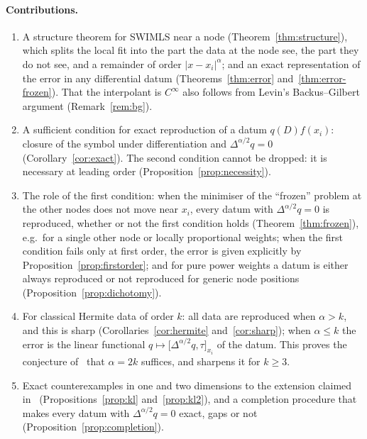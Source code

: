 \documentclass[12pt]{amsart}
\theoremstyle{definition}
\theoremstyle{remark}
\newcommand{\fpz}[3]{\bigl[#1,#2\bigr]_{#3}}     %
\begin{document}
\paragraph{Contributions.}
\begin{enumerate}[label=(\arabic*)]
  \item A structure theorem for SWIMLS near a node (Theorem~\ref{thm:structure}), which splits
        the local fit into the part the data at the node see, the part they do not see, and a
        remainder of order $|x-x_i|^\alpha$; and an exact representation of the error in any
        differential datum (Theorems~\ref{thm:error} and~\ref{thm:error-frozen}). That the
        interpolant is $C^\infty$ also follows from Levin's Backus--Gilbert argument
        (Remark~\ref{rem:bg}).
  \item A sufficient condition for exact reproduction of a datum $q(D)f(x_i)$: closure of the
        symbol under differentiation and $\Delta^{\alpha/2}q=0$ (Corollary~\ref{cor:exact}).
        The second condition cannot be dropped: it is necessary at leading order
        (Proposition~\ref{prop:necessity}).
  \item The role of the first condition: when the minimiser of the ``frozen'' problem at the
        other nodes does not move near $x_i$, every datum with $\Delta^{\alpha/2}q=0$ is
        reproduced, whether or not the first condition holds (Theorem~\ref{thm:frozen}), e.g.\
        for a single other node or locally proportional weights; when the first condition fails
        only at first order, the error is given explicitly by Proposition~\ref{prop:firstorder};
        and for pure power weights a datum is either always reproduced or not reproduced for
        generic node positions (Proposition~\ref{prop:dichotomy}).
  \item For classical Hermite data of order $k$: all data are reproduced when $\alpha>k$, and
        this is sharp (Corollaries~\ref{cor:hermite} and~\ref{cor:sharp}); when $\alpha\le k$
        the error is the linear functional $q\mapsto\fpz{\Delta^{\alpha/2}q}{\tau}{x_i}$ of the
        datum. This proves the conjecture of~\cite[\S3]{KomargodskiLevin2006} that $\alpha=2k$
        suffices, and sharpens it for $k\ge3$.
  \item Exact counterexamples in one and two dimensions to the extension claimed
        in~\cite[\S3]{KomargodskiLevin2006} (Propositions~\ref{prop:kl}
        and~\ref{prop:kl2}), and a completion procedure that makes every datum with $\Delta^{\alpha/2}q=0$ exact, gaps or
        not (Proposition~\ref{prop:completion}).

\end{enumerate}
\end{document}
